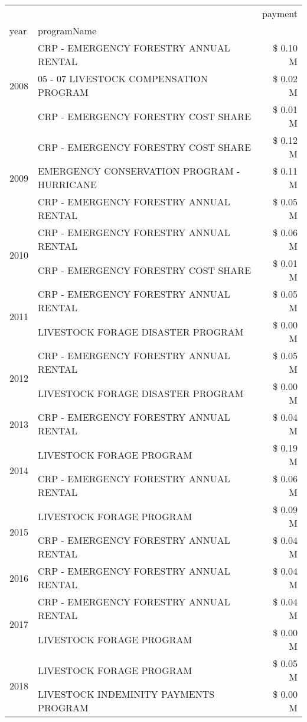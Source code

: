 \begin{tabular}{llr}
\toprule
 &  & payment \\
year & programName &  \\
\midrule
\multirow[t]{3}{*}{2008} & CRP - EMERGENCY FORESTRY ANNUAL RENTAL & \$ 0.10 M \\
 & 05 - 07 LIVESTOCK COMPENSATION PROGRAM & \$ 0.02 M \\
 & CRP - EMERGENCY FORESTRY COST SHARE & \$ 0.01 M \\
\cline{1-3}
\multirow[t]{3}{*}{2009} & CRP - EMERGENCY FORESTRY COST SHARE & \$ 0.12 M \\
 & EMERGENCY CONSERVATION PROGRAM - HURRICANE & \$ 0.11 M \\
 & CRP - EMERGENCY FORESTRY ANNUAL RENTAL & \$ 0.05 M \\
\cline{1-3}
\multirow[t]{2}{*}{2010} & CRP - EMERGENCY FORESTRY ANNUAL RENTAL & \$ 0.06 M \\
 & CRP - EMERGENCY FORESTRY COST SHARE & \$ 0.01 M \\
\cline{1-3}
\multirow[t]{2}{*}{2011} & CRP - EMERGENCY FORESTRY ANNUAL RENTAL & \$ 0.05 M \\
 & LIVESTOCK FORAGE DISASTER PROGRAM & \$ 0.00 M \\
\cline{1-3}
\multirow[t]{2}{*}{2012} & CRP - EMERGENCY FORESTRY ANNUAL RENTAL & \$ 0.05 M \\
 & LIVESTOCK FORAGE DISASTER PROGRAM & \$ 0.00 M \\
\cline{1-3}
2013 & CRP - EMERGENCY FORESTRY ANNUAL RENTAL & \$ 0.04 M \\
\cline{1-3}
\multirow[t]{2}{*}{2014} & LIVESTOCK FORAGE PROGRAM & \$ 0.19 M \\
 & CRP - EMERGENCY FORESTRY ANNUAL RENTAL & \$ 0.06 M \\
\cline{1-3}
\multirow[t]{2}{*}{2015} & LIVESTOCK FORAGE PROGRAM & \$ 0.09 M \\
 & CRP - EMERGENCY FORESTRY ANNUAL RENTAL & \$ 0.04 M \\
\cline{1-3}
2016 & CRP - EMERGENCY FORESTRY ANNUAL RENTAL & \$ 0.04 M \\
\cline{1-3}
\multirow[t]{2}{*}{2017} & CRP - EMERGENCY FORESTRY ANNUAL RENTAL & \$ 0.04 M \\
 & LIVESTOCK FORAGE PROGRAM & \$ 0.00 M \\
\cline{1-3}
\multirow[t]{3}{*}{2018} & LIVESTOCK FORAGE PROGRAM & \$ 0.05 M \\
 & LIVESTOCK INDEMINITY PAYMENTS PROGRAM & \$ 0.00 M \\

\end{tabular}
